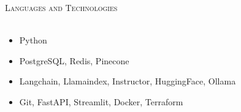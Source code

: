 \documentclass[a4paper]{article}
\newcommand{\lineunder} {
    \vspace*{-8pt} \\
    \hspace*{-18pt} \hrulefill \\
}
\newcommand{\header} [1] {
    {\hspace*{-18pt}\vspace*{6pt} \textsc{#1}}
    \vspace*{-6pt} \lineunder
}
\begin{document}


\header{Languages and Technologies}
\begin{itemize}
    \item Python
    \item PostgreSQL, Redis, Pinecone
    \item Langchain, Llamaindex, Instructor, HuggingFace, Ollama
    \item Git, FastAPI, Streamlit, Docker, Terraform
\end{itemize}

\vspace{2mm}

\
\end{document}
